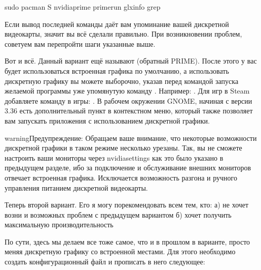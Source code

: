 \documentclass[letterpaper,10pt,russian,openany]{sphinxmanual}
\begin{document}
\begin{sphinxVerbatim}[commandchars=\\\{\}]
sudo pacman \PYGZhy{}S nvidia\PYGZhy{}prime
prime\PYGZhy{}run glxinfo  grep 
\end{sphinxVerbatim}

\sphinxAtStartPar
Если вывод последней команды даёт вам упоминание вашей дискретной видеокарты, значит
вы всё сделали правильно. При возникновении проблем, советуем вам перепройти шаги
указанные выше.

\sphinxAtStartPar
Вот и всё. Данный вариант ещё называют  (обратный PRIME).
После этого у вас будет использоваться встроенная графика по умолчанию, а использовать дискретную графику
вы можете выборочно, указав перед командой запуска желаемой программы уже упомянутую команду .
Например: . Для игр в Steam добавляете команду в  игры: .
В рабочем окружении GNOME, начиная с версии 3.36 есть дополнительный пункт в контекстном меню, который также позволяет
вам запускать приложения с использованием дискретной графики.

\begin{sphinxadmonition}{warning}{Предупреждение:}
\sphinxAtStartPar
Обращаем ваше внимание, что некоторые возможности дискретной графики в таком режиме несколько урезаны.
Так, вы не сможете настроить ваши мониторы через nvidia\sphinxhyphen{}settings как это было указано в предыдущем разделе, ибо за подключение
и обслуживание внешних мониторов отвечает встроенная графика. Исключается возможность разгона и ручного
управления питанием дискретной видеокарты.
\end{sphinxadmonition}

\sphinxAtStartPar
Теперь второй вариант. Его я могу порекомендовать всем тем, кто:
а) не хочет возни и возможных проблем с предыдущем вариантом
б) хочет получить максимальную производительность

\sphinxAtStartPar
По сути, здесь мы делаем все тоже самое, что и в прошлом в варианте, просто меняя
дискретную графику со встроенной местами. Для этого необходимо создать конфигурационный файл
 и прописать в него следующее:
\end{document}
